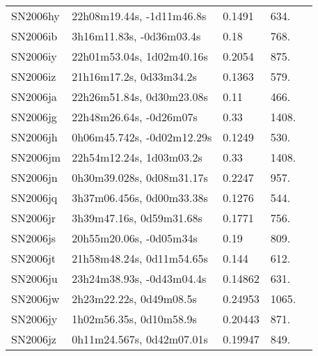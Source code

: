 \begin{longtable}{lllll}
         SN2006hy &      22h08m19.44s, -1d11m46.8s &   0.1491 &           634. &    \citet{2011ApJ...740...92G} \\
         SN2006ib &       3h16m11.83s, -0d36m03.4s &     0.18 &           768. &    \citet{2006CBET..657A...1B} \\
         SN2006iy &      22h01m53.04s, 1d02m40.16s &   0.2054 &           875. &    \citet{2011ApJ...740...92G} \\
         SN2006iz &        21h16m17.2s, 0d33m34.2s &   0.1363 &           579. &    \citet{2011ApJ...740...92G} \\
         SN2006ja &      22h26m51.84s, 0d30m23.08s &     0.11 &           466. &    \citet{2006CBET..667A...1B} \\
         SN2006jg &        22h48m26.64s, -0d26m07s &     0.33 &          1408. &    \citet{2011ApJ...740...92G} \\
         SN2006jh &     0h06m45.742s, -0d02m12.29s &   0.1249 &           530. &    \citet{2011ApJ...740...92G} \\
         SN2006jm &       22h54m12.24s, 1d03m03.2s &     0.33 &          1408. &    \citet{2011ApJ...740...92G} \\
         SN2006jn &      0h30m39.028s, 0d08m31.17s &   0.2247 &           957. &    \citet{2011ApJ...740...92G} \\
         SN2006jq &      3h37m06.456s, 0d00m33.38s &   0.1276 &           544. &    \citet{2011ApJ...740...92G} \\
         SN2006jr &       3h39m47.16s, 0d59m31.68s &   0.1771 &           756. &    \citet{2011ApJ...740...92G} \\
         SN2006js &        20h55m20.06s, -0d05m34s &     0.19 &           809. &    \citet{2006CBET..680A...1B} \\
         SN2006jt &      21h58m48.24s, 0d11m54.65s &    0.144 &           612. &    \citet{2011ApJ...740...92G} \\
         SN2006ju &      23h24m38.93s, -0d43m04.4s &  0.14862 &           631. &    \citet{2001SDSSe.1...0000:} \\
         SN2006jw &        2h23m22.22s, 0d49m08.5s &  0.24953 &          1065. &    \citet{2016SDSSD.C...0000:} \\
         SN2006jy &        1h02m56.35s, 0d10m58.9s &  0.20443 &           871. &    \citet{2016SDSSD.C...0000:} \\
         SN2006jz &      0h11m24.567s, 0d42m07.01s &  0.19947 &           849. &    \citet{2003SDSS1.C...0000:} \\

\end{longtable}

